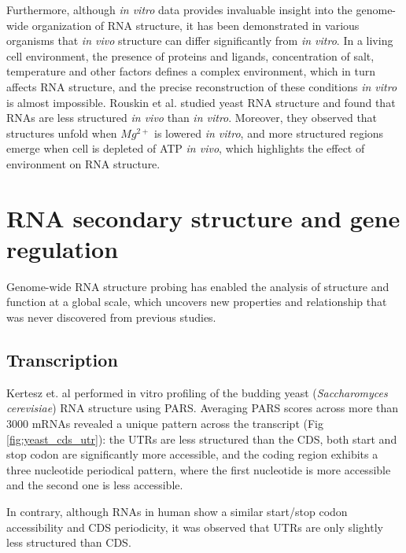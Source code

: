 \documentclass{proposal}
\begin{document}
Furthermore, although \textit{in vitro} data provides invaluable insight into the genome-wide organization of RNA structure,
it has been demonstrated in various organisms that \textit{in vivo} structure can differ significantly from \textit{in vitro}.
In a living cell environment, the presence of proteins and ligands,
concentration of salt, temperature and other factors defines a complex environment, which in turn affects RNA structure,
and the precise reconstruction of these conditions \textit{in vitro} is almost impossible.
﻿Rouskin et al.\cite{rouskin2014genome} studied yeast RNA structure and found that RNAs are
less structured \textit{in vivo} than \textit{in vitro}.
Moreover, they observed that structures unfold when $Mg^{2+}$ is lowered \textit{in vitro},
and more structured regions emerge when cell is depleted of ATP \textit{in vivo},
which highlights the effect of environment on RNA structure.




\section{RNA secondary structure and gene regulation}

Genome-wide RNA structure probing has enabled the analysis of structure and function at a global scale,
which uncovers new properties and relationship that was never discovered from previous studies.

\subsection*{Transcription}

Kertesz et. al\cite{kertesz2010genome} performed in vitro profiling of ﻿the budding yeast
(\textit{Saccharomyces cerevisiae}) RNA structure using PARS.
Averaging PARS scores across more than $3000$ mRNAs revealed a unique pattern across the transcript (Fig \ref{fig:yeast_cds_utr}):
 the UTRs are less structured than the CDS, both start and stop codon are significantly more accessible,
and the coding region exhibits a three nucleotide periodical pattern,
where the first nucleotide is more accessible and the second one is less accessible.

In contrary, although RNAs in human show a similar start/stop codon accessibility and CDS periodicity,
it was observed that UTRs are only slightly less structured than CDS\cite{wan2014landscape}.
\end{document}
